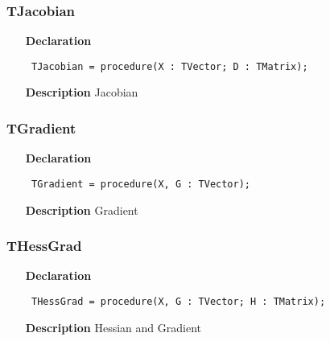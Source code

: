 \documentclass[12pt,a4paper,oneside]{report}
\newcommand{\declarationitem}[1]{\textbf{#1}}
\newcommand{\descriptiontitle}[1]{\textbf{#1}}
\newcommand{\code}[1]{\texttt{#1}}
\begin{document}
\subsubsection{TJacobian}
\label{utypes-TJacobian}
\begin{itemize}\item[\declarationitem{Declaration}\hfill]
	\begin{flushleft}
		\code{
			TJacobian = procedure(X : TVector; D : TMatrix);}
		
	\end{flushleft}
	
	\par
	\item[\descriptiontitle{Description}]
	Jacobian
	
\end{itemize}
\subsubsection{TGradient}
\label{utypes-TGradient}
\begin{itemize}\item[\declarationitem{Declaration}\hfill]
	\begin{flushleft}
		\code{
			TGradient = procedure(X, G : TVector);}
		
	\end{flushleft}
	
	\par
	\item[\descriptiontitle{Description}]
	Gradient
	
\end{itemize}
\subsubsection{THessGrad}
\label{utypes-THessGrad}
\begin{itemize}\item[\declarationitem{Declaration}\hfill]
	\begin{flushleft}
		\code{
			THessGrad = procedure(X, G : TVector; H : TMatrix);}
		
	\end{flushleft}
	
	\par
	\item[\descriptiontitle{Description}]
	Hessian and Gradient
	
\end{itemize}
\end{document}
